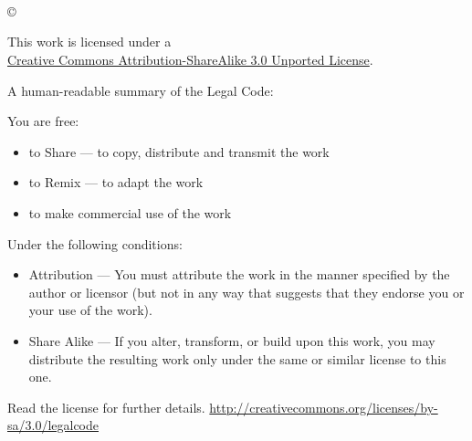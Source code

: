 \thispagestyle{plain}
\begin{titlepage}

\begin{center}

\huge{\textbf{\titel}}\\[1.5ex]
\LARGE{\textbf{\untertitel}}\\[6ex]

\normalsize
\autor\\[1.2ex]
\copyright\ \jahr\\[9ex]

\end{center}

\singlespacing
\small
\noindent 
\begin{center}
This work is licensed under a \\ \hyperlink{http://creativecommons.org/licenses/by-sa/3.0/}{Creative Commons Attribution-ShareAlike 3.0 Unported License}.
\end{center}

A human-readable summary of the Legal Code:

You are free:
\begin{itemize}
\item to Share — to copy, distribute and transmit the work
\item to Remix — to adapt the work
\item to make commercial use of the work
\end{itemize}

Under the following conditions:
\begin{itemize}
\item Attribution — You must attribute the work in the manner specified by the author or licensor (but not in any way that suggests that they endorse you or your use of the work).
\item Share Alike — If you alter, transform, or build upon this work, you may distribute the resulting work only under the same or similar license to this one.
\end{itemize}

Read the license for further details.
\hyperlink{http://creativecommons.org/licenses/by-sa/3.0/legalcode}{http://creativecommons.org/licenses/by-sa/3.0/legalcode}

\end{titlepage}
